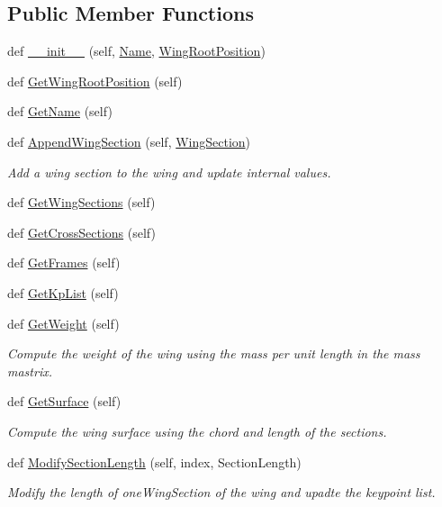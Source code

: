 \subsection*{Public Member Functions}
\begin{DoxyCompactItemize}
\item 
def \hyperlink{classgebtaero_1_1_wing_1_1_wing_ad4899077f16bf8b8dff5e9ce86c4b2c0}{\+\_\+\+\_\+init\+\_\+\+\_\+} (self, \hyperlink{classgebtaero_1_1_wing_1_1_wing_a1c41ea89cf72ec60090134497f1ede15}{Name}, \hyperlink{classgebtaero_1_1_wing_1_1_wing_aa0957399544603f1df3cdb3b02eeda4a}{Wing\+Root\+Position})
\item 
def \hyperlink{classgebtaero_1_1_wing_1_1_wing_a6623e4ea917c8a03a3de9bbf7110e754}{Get\+Wing\+Root\+Position} (self)
\item 
def \hyperlink{classgebtaero_1_1_wing_1_1_wing_a180f53c7c326569cc0c8e8c78a3a0b2a}{Get\+Name} (self)
\item 
def \hyperlink{classgebtaero_1_1_wing_1_1_wing_ae2bcf197a55c10900d837bc0d9d6aac7}{Append\+Wing\+Section} (self, \hyperlink{classgebtaero_1_1_wing_section_1_1_wing_section}{Wing\+Section})
\begin{DoxyCompactList}\small\item\em Add a wing section to the wing and update internal values. \end{DoxyCompactList}\item 
def \hyperlink{classgebtaero_1_1_wing_1_1_wing_a9fbfa35745a94279f37ebf497a36126e}{Get\+Wing\+Sections} (self)
\item 
def \hyperlink{classgebtaero_1_1_wing_1_1_wing_a15245b467e6be2a7ace9a917e67661ff}{Get\+Cross\+Sections} (self)
\item 
def \hyperlink{classgebtaero_1_1_wing_1_1_wing_a0bd0def91e16cd1a19b10fcdf8c50e41}{Get\+Frames} (self)
\item 
def \hyperlink{classgebtaero_1_1_wing_1_1_wing_afe768db8f9a06bd5784143c1168a5acc}{Get\+Kp\+List} (self)
\item 
def \hyperlink{classgebtaero_1_1_wing_1_1_wing_a290d5e1d3a18de515339ffbed0f0df35}{Get\+Weight} (self)
\begin{DoxyCompactList}\small\item\em Compute the weight of the wing using the mass per unit length in the mass mastrix. \end{DoxyCompactList}\item 
def \hyperlink{classgebtaero_1_1_wing_1_1_wing_af0be9af67eb300ebc83262025f6c80af}{Get\+Surface} (self)
\begin{DoxyCompactList}\small\item\em Compute the wing surface using the chord and length of the sections. \end{DoxyCompactList}\item 
def \hyperlink{classgebtaero_1_1_wing_1_1_wing_a3b5df3a1833448d36becf9a5a9f3e951}{Modify\+Section\+Length} (self, index, Section\+Length)
\begin{DoxyCompactList}\small\item\em Modify the length of one\+Wing\+Section of the wing and upadte the keypoint list. \end{DoxyCompactList}\end{DoxyCompactItemize}
